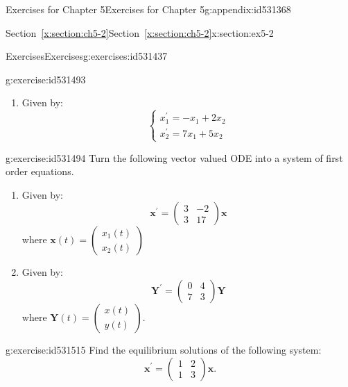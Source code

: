 \documentclass[oneside,10pt,]{book}
\newcommand{\xreffont}{\relax}
\numberwithin{equation}{section}
\numberwithin{equation}{section}
\newcommand{\amp}{&}
\begin{document}
\begin{appendixptx}{Exercises for Chapter 5}{}{Exercises for Chapter 5}{}{}{g:appendix:id531368}
\begin{sectionptx}{Section~{\xreffont\ref*{x:section:ch5-2}}}{}{Section~{\xreffont\ref*{x:section:ch5-2}}}{}{}{x:section:ex5-2}
\begin{exercises-subsection-numberless}{Exercises}{}{Exercises}{}{}{g:exercises:id531437}
\begin{divisionexercise}{2}{}{}{g:exercise:id531493}
\begin{enumerate}[label=(\alph*)]
\begin{equation*}
\begin{cases}
x_{2}^{\prime}=9x_{1}-3x_{2}
\end{cases}
\end{equation*}
%
\item{}Given by:%
\begin{equation*}
\begin{cases}
x_{1}^{\prime}=-x_{1}+2x_{2}\\
x_{2}^{\prime}=7x_{1}+5x_{2}
\end{cases}
\end{equation*}
%
\end{enumerate}
\end{divisionexercise}%
\begin{divisionexercise}{3}{}{}{g:exercise:id531494}%
Turn the following vector valued ODE into a system of first order equations.%
%
\begin{enumerate}[label=(\alph*)]
\item{}Given by:%
\begin{equation*}
\mathbf{x}^{\prime}=\left(\begin{array}{cc}
3 \amp -2\\
3 \amp 17
\end{array}\right)\mathbf{x}
\end{equation*}
where \(\boldsymbol{x}(t)=\left(\begin{array}{c}
x_{1}(t)\\
x_{2}(t)
\end{array}\right)\)%
\item{}Given by:%
\begin{equation*}
\boldsymbol{Y}^{\prime}=\left(\begin{array}{cc}
0 \amp 4\\
7 \amp 3
\end{array}\right)\boldsymbol{Y}
\end{equation*}
where \(\boldsymbol{Y}(t)=\left(\begin{array}{c}
x(t)\\
y(t)
\end{array}\right)\).%
\end{enumerate}
\end{divisionexercise}%
\begin{divisionexercise}{4}{}{}{g:exercise:id531515}%
Find the equilibrium solutions of the following system:%
\begin{equation*}
\mathbf{x}^{\prime}=\left(\begin{array}{cc}
1 \amp 2\\
1 \amp 3
\end{array}\right)\mathbf{x}.

\end{equation*}
\end{divisionexercise}
\end{exercises-subsection-numberless}
\end{sectionptx}
\end{appendixptx}
\end{document}
